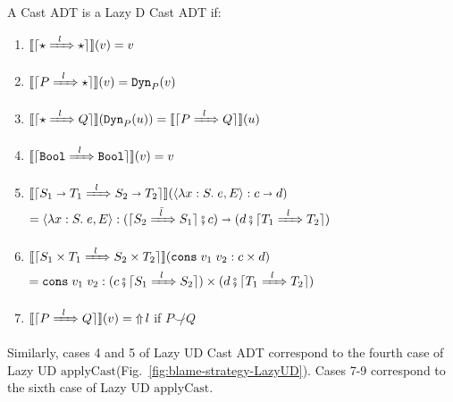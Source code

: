 \documentclass[runningheads]{llncs}
\newcommand{\error}[1]{\ensuremath{\mathop{\Uparrow}#1}}
\newcommand{\Tdyn}[0]{\ensuremath{\star}}
\newcommand{\Pbool}[0]{\ensuremath{\mathtt{Bool}}}
\newcommand{\Pfunc}[2]{\ensuremath{#1 \shortrightarrow #2}}
\newcommand{\Pprod}[2]{\ensuremath{#1 \times #2}}
\newcommand{\elam}[3]{\lambda#1:#2.\;#3}
\newcommand{\econs}[2]{\mathtt{cons} \; #1 \; #2}
\newcommand{\ecast}[2]{\ensuremath{#1 : #2}}
\newcommand{\ccast}[3]{#1 \xRightarrow[]{\enskip #2 \enskip} #3}
\newcommand{\vdyn}[2]{\mathtt{Dyn}_{#1}(#2)}
\newcommand{\vfunc}[4]{\langle\elam{#1}{#2}{#3},#4\rangle}
\newcommand{\vcons}[2]{\econs{#1}{#2}}
\newcommand{\denote}[1]{\ensuremath{\llbracket #1 \rrbracket}}
\newcommand{\compose}[2]{\ensuremath{#1 \fatsemi #2}}
\newcommand{\translate}[1]{\ensuremath{\lceil#1\rceil}}
\newcommand{\applyCastName}[0]{\ensuremath{\mathrm{applyCast}}}
\newcommand{\notshallowlyconsistent}[2]{\ensuremath{#1\not\smile#2}}
\begin{document}
\begin{definition}
	\label{def:LazyD-CastADT}
	A Cast ADT is a Lazy D Cast ADT if:
	\begin{enumerate}
		\item $\denote{\translate{\ccast{\Tdyn}{l}{\Tdyn}}}(v) = v$
		\item $\denote{\translate{\ccast{P}{l}{\Tdyn}}}(v) = \vdyn{P}{v}$
		\item $\denote{\translate{\ccast{\Tdyn}{l}{Q}}}(\vdyn{P}{u}) = 
		\denote{\translate{\ccast{P}{l}{Q}}}(u)$
		\item $\denote{\translate{\ccast{\Pbool}{l}{\Pbool}}}(v) = v$
		\item 
		$\denote{\translate{\ccast{\Pfunc{S_1}{T_1}}{l}{\Pfunc{S_2}{T_2}}}}(
			\ecast{\vfunc{x}{S}{e}{E}}{\Pfunc{c}{d}})$\\
		$=
		\ecast{\vfunc{x}{S}{e}{E}}{
			\Pfunc{
				(\compose{\translate{\ccast{S_2}{\bar{l}}{S_1}}}{c})}{
				(\compose{d}{\translate{\ccast{T_1}{l}{T_2}}})}}$
		\item 
		$\denote{\translate{\ccast{\Pprod{S_1}{T_1}}{l}{\Pprod{S_2}{T_2}}}}(
		\ecast{\vcons{v_1}{v_2}}{\Pprod{c}{d}})$\\
		$=
		\ecast{\vcons{v_1}{v_2}}{
			\Pprod{
				(\compose{c}{\translate{\ccast{S_1}{l}{S_2}}})}{
				(\compose{d}{\translate{\ccast{T_1}{l}{T_2}}})}}$
		\item $\denote{\translate{\ccast{P}{l}{Q}}}(v) = \error{l}$ \qquad
			if $\notshallowlyconsistent{P}{Q}$
	\end{enumerate}
\end{definition}

Similarly, cases 4 and 5 of Lazy UD Cast ADT correspond to the fourth
case of Lazy UD \applyCastName (Fig.~\ref{fig:blame-strategy-LazyUD}).
Cases 7-9 correspond to the sixth case of
Lazy UD \applyCastName.
\end{document}
